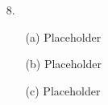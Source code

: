 \documentclass[11pt]{article}
\begin{document}
\begin{itemize}
    \item[8.]
        \begin{itemize}
            \item[(a)]
                Placeholder

            \item[(b)]
                Placeholder

            \item[(c)]
                Placeholder
        \end{itemize}
\end{itemize}

\end{document}
